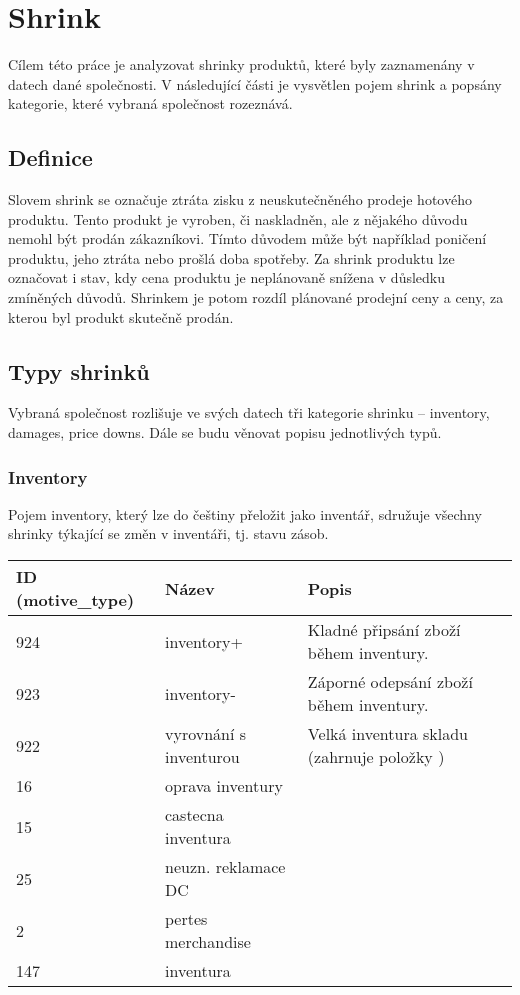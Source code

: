 \chapter{Shrink}

Cílem této práce je analyzovat shrinky produktů, které byly zaznamenány v datech dané společnosti. V následující části je vysvětlen pojem shrink a popsány kategorie, které vybraná společnost rozeznává.

\section{Definice}

Slovem shrink se označuje ztráta zisku z neuskutečněného prodeje hotového produktu. Tento produkt je vyroben, či naskladněn, ale z nějakého důvodu nemohl být prodán zákazníkovi. Tímto důvodem může být například poničení produktu, jeho ztráta nebo prošlá doba spotřeby. Za shrink produktu lze označovat i stav, kdy cena produktu je neplánovaně snížena v důsledku zmíněných důvodů. Shrinkem je potom rozdíl plánované prodejní ceny a ceny, za kterou byl produkt skutečně prodán.\cite{bib:DefShrink}



\section{Typy shrinků}

Vybraná společnost rozlišuje ve svých datech tři kategorie shrinku -- inventory, damages, price downs. Dále se budu věnovat popisu jednotlivých typů.

\subsection*{Inventory}

Pojem inventory, který lze do češtiny přeložit jako inventář, sdružuje všechny shrinky týkající se změn v inventáři, tj. stavu zásob.

\begin{table}[]
    \begin{tabular}{lll}
    ID (motive\_type) & Název             & Popis \\
    \hline
    924          & inventory+             & Kladné připsání zboží během inventury.      \\
    923          & inventory-             & Záporné odepsání zboží během inventury.      \\
    922          & vyrovnání s inventurou & Velká inventura skladu (zahrnuje položky )      \\
    16           & oprava inventury       &       \\
    15           & castecna inventura     &       \\
    25           & neuzn. reklamace DC    &       \\
    2            & pertes merchandise     &       \\
    147          & inventura              &      
    \end{tabular}
\end{table}


